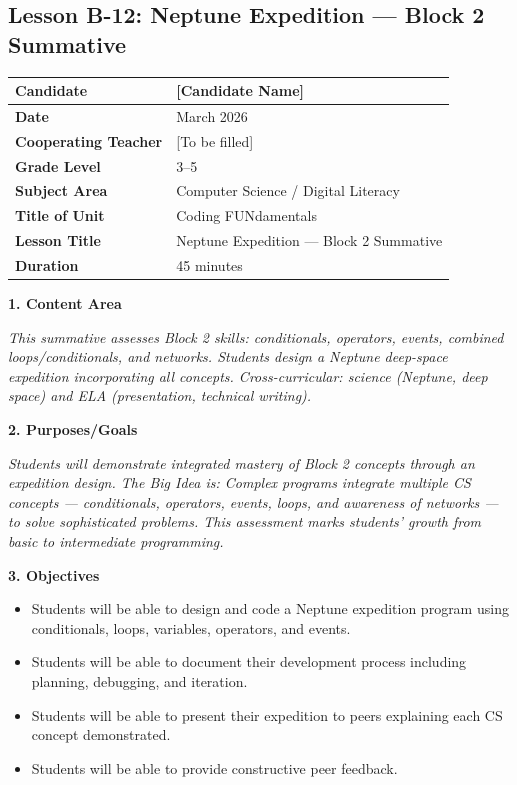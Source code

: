 \documentclass[11pt,letterpaper]{article}
\begin{document}
\newpage
\subsection{Lesson B-12: Neptune Expedition --- Block 2 Summative}
\label{sub:LessonB12NeptuneExpeditionBlock2Summative}

\begin{longtable}{|L{0.28\textwidth}|L{0.65\textwidth}|}
\hline
\textbf{Candidate}  & [Candidate Name]  \\
\hline
\textbf{Date}  & March 2026  \\
\hline
\textbf{Cooperating Teacher}  & [To be filled]  \\
\hline
\textbf{Grade Level}  & 3--5  \\
\hline
\textbf{Subject Area}  & Computer Science / Digital Literacy  \\
\hline
\textbf{Title of Unit}  & Coding FUNdamentals  \\
\hline
\textbf{Lesson Title}  & Neptune Expedition --- Block 2 Summative  \\
\hline
\textbf{Duration}  & 45 minutes  \\
\hline
\end{longtable}

\textbf{1. Content Area}

\textit{This summative assesses Block 2 skills: conditionals, operators, events, combined loops/conditionals, and networks. Students design a Neptune deep-space expedition incorporating all concepts. Cross-curricular: science (Neptune, deep space) and ELA (presentation, technical writing).}

\textbf{2. Purposes/Goals}

\textit{Students will demonstrate integrated mastery of Block 2 concepts through an expedition design. The Big Idea is: Complex programs integrate multiple CS concepts --- conditionals, operators, events, loops, and awareness of networks --- to solve sophisticated problems. This assessment marks students' growth from basic to intermediate programming.}

\textbf{3. Objectives}

\begin{itemize}
  \item Students will be able to design and code a Neptune expedition program using conditionals, loops, variables, operators, and events.

  \item Students will be able to document their development process including planning, debugging, and iteration.

  \item Students will be able to present their expedition to peers explaining each CS concept demonstrated.

  \item Students will be able to provide constructive peer feedback.
\end{itemize}
\end{document}
